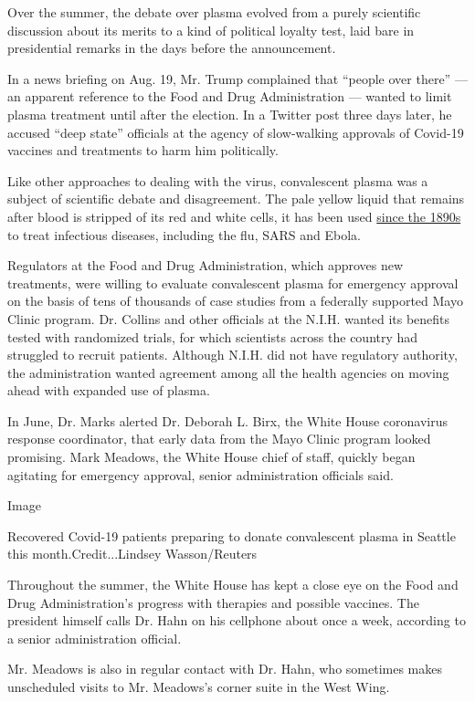 Over the summer, the debate over plasma evolved from a purely scientific
discussion about its merits to a kind of political loyalty test, laid
bare in presidential remarks in the days before the announcement.

In a news briefing on Aug. 19, Mr. Trump complained that ``people over
there'' --- an apparent reference to the Food and Drug Administration
--- wanted to limit plasma treatment until after the election. In a
Twitter post three days later, he accused ``deep state'' officials at
the agency of slow-walking approvals of Covid-19 vaccines and treatments
to harm him politically.

Like other approaches to dealing with the virus, convalescent plasma was
a subject of scientific debate and disagreement. The pale yellow liquid
that remains after blood is stripped of its red and white cells, it has
been used
\href{https://www.ncbi.nlm.nih.gov/pmc/articles/PMC4781783/}{since the
1890s} to treat infectious diseases, including the flu, SARS and Ebola.

Regulators at the Food and Drug Administration, which approves new
treatments, were willing to evaluate convalescent plasma for emergency
approval on the basis of tens of thousands of case studies from a
federally supported Mayo Clinic program. Dr. Collins and other officials
at the N.I.H. wanted its benefits tested with randomized trials, for
which scientists across the country had struggled to recruit patients.
Although N.I.H. did not have regulatory authority, the administration
wanted agreement among all the health agencies on moving ahead with
expanded use of plasma.

In June, Dr. Marks alerted Dr. Deborah L. Birx, the White House
coronavirus response coordinator, that early data from the Mayo Clinic
program looked promising. Mark Meadows, the White House chief of staff,
quickly began agitating for emergency approval, senior administration
officials said.

Image

Recovered Covid-19 patients preparing to donate convalescent plasma in
Seattle this month.Credit...Lindsey Wasson/Reuters

Throughout the summer, the White House has kept a close eye on the Food
and Drug Administration's progress with therapies and possible vaccines.
The president himself calls Dr. Hahn on his cellphone about once a week,
according to a senior administration official.

Mr. Meadows is also in regular contact with Dr. Hahn, who sometimes
makes unscheduled visits to Mr. Meadows's corner suite in the West Wing.

